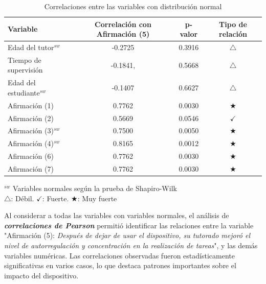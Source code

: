 \documentclass[a4paper,fleqn]{cas-sc}
\begin{document}
					\begin{table}[h!]
						\centering
						\caption{Correlaciones entre las variables con distribución normal}
						\begin{tabularx}{0.75\textwidth}{Xccc}
							\toprule
							\textbf{Variable} & \textbf{Correlación con Afirmación (5)} &  \textbf{p-valor} & \textbf{Tipo de relación} \\
							\midrule
							Edad del tutor$^{sw}$ & -0.2725 & 0.3916 & \(\bigtriangleup\) \\ %
							Tiempo de supervisión & -0.1841, & 0.5668 & \(\bigtriangleup\) \\ %
							Edad del estudiante$^{sw}$ & -0.1407 & 0.6627 & \(\bigtriangleup\) \\ %
							Afirmación (1) & 0.7762 & 0.0030 & \(\bigstar\) \\ %
							Afirmación (2) & 0.5669 & 0.0546 & \(\checkmark\) \\ %
							Afirmación (3)$^{sw}$ & 0.7500 & 0.0050 & \(\bigstar\) \\ %
							Afirmación (4)$^{sw}$ & 0.8165 & 0.0012 & \(\bigstar\) \\ %
							Afirmación (6) & 0.7762 & 0.0030 & \(\bigstar\) \\ %
							Afirmación (7) & 0.7762 & 0.0030 & \(\bigstar\) \\ %
							\bottomrule
						\end{tabularx}
						\label{table:Pearson-Correlation}
						\vspace{0.3em} %
						\parbox{0.75\textwidth}{\footnotesize
							$^{sw}$ Variables normales según la prueba de Shapiro-Wilk\\
							\(\bigtriangleup\): Débil. \(\checkmark\): Fuerte. \(\bigstar\): Muy fuerte
						}
					\end{table}
						
					Al considerar a todas las variables con variables normales, el análisis de \textit{\textbf{correlaciones de Pearson}} permitió identificar las relaciones entre la variable "Afirmación (5): \textit{Después de dejar de usar el dispositivo, su tutorado mejoró el nivel de autorregulación y concentración en la realización de tareas}", y las demás variables numéricas. Las correlaciones observadas fueron estadísticamente significativas en varios casos, lo que destaca patrones importantes sobre el impacto del dispositivo.
						
\end{document}
